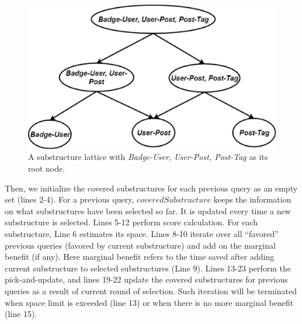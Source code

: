 \begin {figure}[h]
\centering
\includegraphics[scale=0.5]{pic/Structurelattice.eps}
\caption{A substructure lattice with \textit{Badge-User, User-Post, Post-Tag} as its root node.}
\label{fig:4:3}
\end{figure}


Then, we initialize the covered substructures for each previous query as an empty set (lines 2-4). For a previous query, $coveredSubstructure$ keeps the information on what substructures have been selected so far. %
It is updated every time a new substructure is selected. Lines 5-12 perform score calculation. For each substructure, Line 6 estimates its space. Lines 8-10 iterate over all ``favored'' previous queries (favored by current substructure) and add on the marginal benefit (if any). Here marginal benefit refers to the time saved after adding current substructure to selected substructures (Line 9). Lines 13-23 perform the pick-and-update, and lines 19-22 update the covered substructures for previous queries as a result of current round of selection. Such iteration will be terminated when space limit is exceeded (line 13) or when there is no more marginal benefit (line 15).

